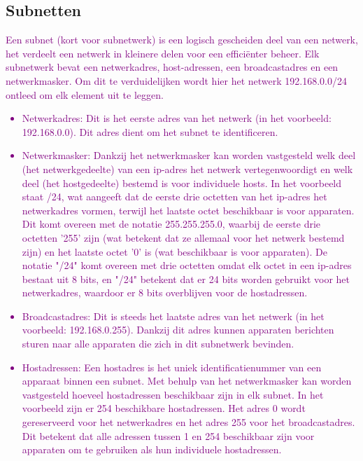 {\subsection{Subnetten}
\textcolor{purple}{Een subnet (kort voor subnetwerk) is een logisch gescheiden deel van een netwerk, het verdeelt een netwerk in kleinere delen voor een efficiënter beheer. Elk subnetwerk bevat een netwerkadres, host-adressen, een broadcastadres en een netwerkmasker. Om dit te verduidelijken wordt hier het netwerk 192.168.0.0/24 ontleed om elk element uit te leggen.}
\textcolor{purple}{
\begin{itemize}
    \item Netwerkadres: Dit is het eerste adres van het netwerk (in het voorbeeld: 192.168.0.0). Dit adres dient om het subnet te identificeren.
    \item Netwerkmasker: Dankzij het netwerkmasker kan worden vastgesteld welk deel (het netwerkgedeelte) van een \acrshort{ip}-adres het netwerk vertegenwoordigt en welk deel (het hostgedeelte) bestemd is voor individuele hosts. In het voorbeeld staat /24, wat aangeeft dat de eerste drie octetten van het \acrshort{ip}-adres het netwerkadres vormen, terwijl het laatste octet beschikbaar is voor apparaten. Dit komt overeen met de notatie 255.255.255.0, waarbij de eerste drie octetten '255' zijn (wat betekent dat ze allemaal voor het netwerk bestemd zijn) en het laatste octet '0' is (wat beschikbaar is voor apparaten). De notatie "/24" komt overeen met drie octetten omdat elk octet in een \acrshort{ip}-adres bestaat uit 8 bits, en "/24" betekent dat er 24 bits worden gebruikt voor het netwerkadres, waardoor er 8 bits overblijven voor de hostadressen.      
    \item Broadcastadres: Dit is steeds het laatste adres van het netwerk (in het voorbeeld: 192.168.0.255). Dankzij dit adres kunnen apparaten berichten sturen naar alle apparaten die zich in dit subnetwerk bevinden.
    \item Hostadressen: Een hostadres is het uniek identificatienummer van een apparaat binnen een subnet. Met behulp van het netwerkmasker kan worden vastgesteld hoeveel hostadressen beschikbaar zijn in elk subnet. In het voorbeeld zijn er 254 beschikbare hostadressen. Het adres 0 wordt gereserveerd voor het netwerkadres en het adres 255 voor het broadcastadres. Dit betekent dat alle adressen tussen 1 en 254 beschikbaar zijn voor apparaten om te gebruiken als hun individuele hostadressen.
\end{itemize}
}

}
